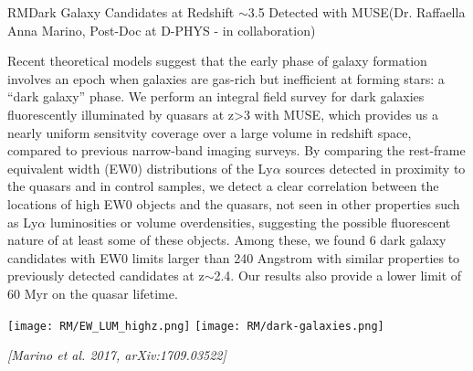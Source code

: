 \begin{section}{RM}{Dark Galaxy Candidates at Redshift $\sim$3.5 Detected with
    MUSE}{(Dr. Raffaella Anna Marino, Post-Doc at D-PHYS - in collaboration)}
  \begin{minipage}[l]{\textwidth}

    {\small Recent theoretical models suggest that the early phase of galaxy
      formation involves an epoch when galaxies are gas-rich but inefficient
      at forming stars: a ``dark galaxy'' phase. We perform an integral field
      survey for dark galaxies fluorescently illuminated by quasars at z>3
      with MUSE, which provides us a nearly uniform sensitvity coverage over a
      large volume in redshift space, compared to previous narrow-band imaging
      surveys. By comparing the rest-frame equivalent width (EW0)
      distributions of the Ly$\alpha$ sources detected in proximity to the
      quasars and in control samples, we detect a clear correlation between
      the locations of high EW0 objects and the quasars, not seen in other
      properties such as Ly$\alpha$ luminosities or volume overdensities,
      suggesting the possible fluorescent nature of at least some of these
      objects. Among these, we found 6 dark galaxy candidates with EW0 limits
      larger than 240 Angstrom with similar properties to previously detected
      candidates at z$\sim$2.4. Our results also provide a lower limit of 60 Myr on
      the quasar lifetime.}
  \end{minipage}

  \vspace{0.5cm}

  \begin{minipage}[t]{\linewidth}
    \begin{center}
      \texttt{[image: RM/EW\_LUM\_highz.png]}
      \texttt{[image: RM/dark-galaxies.png]}
    \end{center}
  \end{minipage}

  \vspace{0.5cm}

  {\footnotesize \textit{[Marino et al. 2017, arXiv:1709.03522]}}
\end{section}